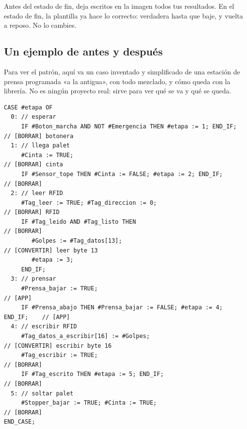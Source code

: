 Antes del estado de fin, deja escritos en la imagen todos tus resultados. En el estado de fin, la plantilla ya hace lo correcto:  verdadera hasta que  baje, y vuelta a reposo. No lo cambies.


\subsection{Un ejemplo de antes y después}
Para ver el patrón, aquí va un caso inventado y simplificado de una estación de prensa programada «a la antigua», con todo mezclado, y cómo queda con la librería. No es ningún proyecto real: sirve para ver qué se va y qué se queda.

\begin{lstlisting}[caption={Antes: todo mezclado (ejemplo ilustrativo).}]
CASE #etapa OF
  0: // esperar
     IF #Boton_marcha AND NOT #Emergencia THEN #etapa := 1; END_IF;       // [BORRAR] botonera
  1: // llega palet
     #Cinta := TRUE;                                                       // [BORRAR] cinta
     IF #Sensor_tope THEN #Cinta := FALSE; #etapa := 2; END_IF;            // [BORRAR]
  2: // leer RFID
     #Tag_leer := TRUE; #Tag_direccion := 0;                               // [BORRAR] RFID
     IF #Tag_leido AND #Tag_listo THEN                                     // [BORRAR]
        #Golpes := #Tag_datos[13];                                         // [CONVERTIR] leer byte 13
        #etapa := 3;
     END_IF;
  3: // prensar
     #Prensa_bajar := TRUE;                                                // [APP]
     IF #Prensa_abajo THEN #Prensa_bajar := FALSE; #etapa := 4; END_IF;    // [APP]
  4: // escribir RFID
     #Tag_datos_a_escribir[16] := #Golpes;                                 // [CONVERTIR] escribir byte 16
     #Tag_escribir := TRUE;                                                // [BORRAR]
     IF #Tag_escrito THEN #etapa := 5; END_IF;                             // [BORRAR]
  5: // soltar palet
     #Stopper_bajar := TRUE; #Cinta := TRUE;                               // [BORRAR]
END_CASE;
\end{lstlisting}

